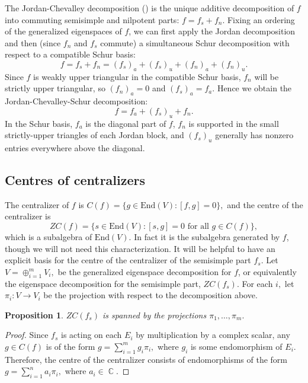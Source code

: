 \documentclass[10pt]{amsart}
\newtheorem{prop}[thm]{Proposition}
\theoremstyle{definition}
\DeclareMathOperator{\C}{\mathbb{C}}
\begin{document}
The Jordan-Chevalley decomposition (\cite[section 4.2]{Hu}) is the unique additive decomposition of $f$ into commuting semisimple and nilpotent parts: $f = f_s + f_n$. Fixing an ordering of the generalized eigenspaces of $f$, we can first apply the Jordan decomposition and then (since $f_n$ and $f_s$ commute) a simultaneous Schur decomposition with respect to a compatible Schur basis:
\[
f = f_s + f_n = (f_s)_a + (f_s)_u + (f_n)_a + (f_n)_u.
\]
Since $f$ is weakly upper triangular in the compatible Schur basis, $f_n$ will be strictly upper triangular, so $(f_n)_a = 0$ and $(f_s)_a = f_a$. Hence we obtain the Jordan-Chevalley-Schur decomposition:
\[
f = f_a + (f_s)_u + f_n. 
\]
In the Schur basis, $f_a$ is the diagonal part of $f$, $f_n$ is supported in the small strictly-upper triangles of each Jordan block, and $(f_s)_u$ generally has nonzero entries everywhere above the diagonal.

\subsection{Centres of centralizers}\label{DCthm}
The centralizer of $f$ is $C(f)=\{g\in \textrm{End}(V): [f,g]=0\},$ and the centre of the centralizer is $$ZC(f)=\{s\in \textrm{End}(V): [s,g]=0 \textrm{ for all } g\in C(f)\},$$ which is a subalgebra of $\textrm{End}(V).$ In fact it is the subalgebra generated by $f$, though we will not need this characterization.
It will be helpful to have an explicit basis for the centre of the centralizer of the semisimple part $f_s$. Let $V=\oplus_{i=1}^m V_i,$ be the generalized eigenspace decomposition for $f$, or equivalently the eigenspace decomposition for the semisimple part, $ZC(f_s).$ For each $i,$ let $\pi_i:V\to V_i$ be the projection with respect to the decomposition above.
\begin{prop}\label{pispan}
    $ZC(f_s)$ is spanned by the projections $\pi_1,\dots, \pi_m.$
\end{prop}
\begin{proof}
    Since $f_s$ is acting on each $E_i$ by multiplication by a complex scalar, any $g\in C(f)$ is of the form $g=\sum_{i=1}^m g_i\pi_i,$ where $g_i$ is some endomorphism of $E_i$. Therefore, the centre of the centralizer consists of endomorphisms of the form $g=\sum_{i=1}^n a_i\pi_i,$ where $a_i\in \C.$
\end{proof}
\end{document}
